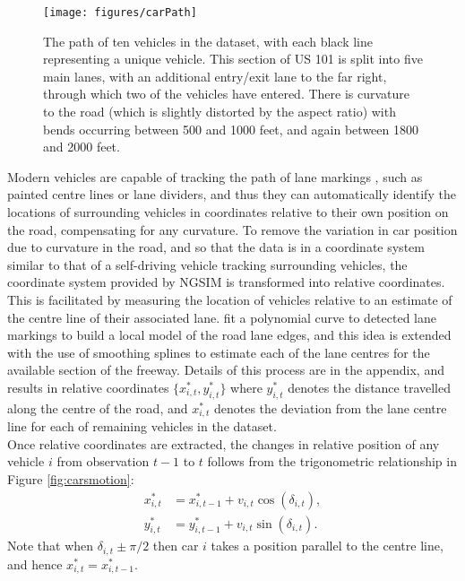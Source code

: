 \documentclass[
12pt, %
onehalfspacing, %
nohyperref, %
headsepline, %
chapterinoneline, %
]{MastersDoctoralThesis} %
\begin{document}
\begin{figure}[htbp]
\centering
\texttt{[image: figures/carPath]}
\caption{The path of ten vehicles in the dataset, with each black line representing a unique vehicle. This section of US 101 is split into five main lanes, with an additional entry/exit lane to the far right, through which two of the vehicles have entered. There is curvature to the road (which is slightly distorted by the aspect ratio) with bends occurring between 500 and 1000 feet, and again between 1800 and 2000 feet.}
\label{fig:carsrawData}
\end{figure}

Modern vehicles are capable of tracking the path of lane markings \citep{Thuy2010}, such as painted centre lines or lane dividers, and thus they can automatically identify the locations of surrounding vehicles in coordinates relative to their own position on the road, compensating for any curvature. To remove the variation in car position due to curvature in the road, and so that the data is in a coordinate system similar to that of a self-driving vehicle tracking surrounding vehicles, the coordinate system provided by NGSIM is transformed into relative coordinates. This is facilitated by measuring the location of vehicles relative to an estimate of the centre line of their associated lane. \citet{Woo2016a} fit a polynomial curve to detected lane markings to build a local model of the road lane edges, and this idea is extended with the use of smoothing splines to estimate each of the lane centres for the available section of the freeway. Details of this process are in the appendix, and results in relative coordinates $\{x^*_{i, t}, y^*_{i, t}\}$  where $y^*_{i, t}$ denotes the distance travelled along the centre of the road, and $x^*_{i, t}$ denotes the deviation from the lane centre line for each of remaining vehicles in the dataset.
\\

Once relative coordinates are extracted, the changes in relative position of any vehicle $i$ from observation $t-1$ to $t$ follows from the trigonometric relationship in Figure \ref{fig:carsmotion}:
\begin{align}
x^*_{i, t} &= x^*_{i, t-1} + v_{i, t} \cos(\delta_{i, t}) \label{cars:xEq}, \\
y^*_{i, t} &= y^*_{i, t-1} + v_{i, t} \sin(\delta_{i, t}) \label{cars:yEq}.
\end{align}
Note that when $\delta_{i, t} \pm \pi/2$ then car $i$ takes a position parallel to the centre line, and hence $x^*_{i, t} = x^*_{i, t-1}$.
\\
\end{document}
